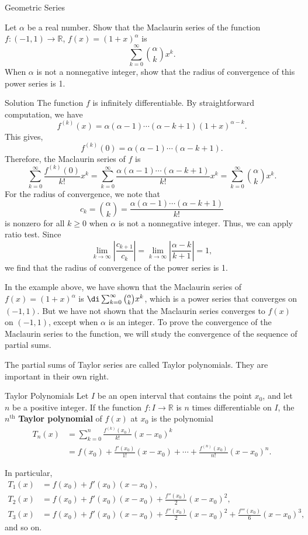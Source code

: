 \begin{example}[label=230305_16]{Geometric Series}
\begin{example}[label=230304_9]{}
\begin{example}{}
\begin{example}[label=230307_9]{}
Let $\alpha$ be a real number. Show that the Maclaurin series of the function $f:(-1,1)\to\mathbb{R}$, $f(x)=(1+x)^{\alpha}$ is
\[\sum_{k=0}^{\infty}\binom{\alpha}{k}x^k.\]
When $\alpha$ is not a nonnegative integer, show that the radius of convergence of this power series is 1.
\end{example}\begin{solution}{Solution}
The function $f$ is infinitely differentiable. By straightforward computation, we have
\[f^{(k)}(x)=\alpha(\alpha-1)\cdots (\alpha-k+1)(1+x)^{\alpha-k}.\]
This gives, 
\[f^{(k)}(0)=\alpha(\alpha-1)\cdots (\alpha-k+1).\]
Therefore, the Maclaurin series of $f$ is
\[\sum_{k=0}^{\infty}\frac{f^{(k)}(0)}{k!}x^k=\sum_{k=0}^{\infty}\frac{\alpha(\alpha-1)\cdots (\alpha-k+1)}{k!}x^k=\sum_{k=0}^{\infty}\binom{\alpha}{k}x^k.\]
For the radius of convergence, we note that
\[c_k=\binom{\alpha}{k}=\frac{\alpha(\alpha-1)\cdots(\alpha-k+1)}{k!}\] is nonzero for all $k\geq 0$ when $\alpha$ is not a nonnegative integer. Thus, we can apply ratio test. Since
\[\lim_{k\to\infty}\left|\frac{c_{k+1}}{c_k}\right|=\lim_{k\to\infty}\left|\frac{\alpha -k}{k+1}\right|=1,\]
we find that the radius of convergence of the power series is 1.
\end{solution}
In the example above, we have shown that the Maclaurin  series of $f(x)=(1+x)^{\alpha}$ is $\di \sum_{k=0}^{\infty}\binom{\alpha}{k}x^k$, which is a power series that converges on $(-1,1)$. But we have not shown that the Maclaurin series converges to $f(x)$ on $(-1,1)$, except when $\alpha$ is an integer. To prove the convergence of the Maclaurin series to the function, we will study the convergence of the sequence of partial sums.

The  partial sums of Taylor series are called Taylor polynomials. They are important in their own right.

\begin{definition}{Taylor Polynomials}
Let $I$ be an open interval that contains the point $x_0$, and let $n$ be a positive integer.  If  the function $f:I\to\mathbb{R}$ is $n$ times differentiable on $I$,  the $n^{\text{th}}$  {\bf Taylor polynomial} of $f(x)$ at $x_0$ is the polynomial
\begin{align*}T_n(x)&=\sum_{k=0}^{n}\frac{f^{(k)}(x_0)}{k!}(x-x_0)^k\\&=f(x_0)+\frac{f'(x_0)}{1!}(x-x_0) +\cdots+\frac{f^{(n)}(x_0)}{n!}(x-x_0)^n.\end{align*}
\end{definition}
In particular,
\begin{align*}
T_1(x)&=f(x_0)+f'(x_0)(x-x_0),\\
T_2(x)&=f(x_0)+f'(x_0)(x-x_0)+\frac{f''(x_0)}{2}(x-x_0)^2,\\
T_3(x)&=f(x_0)+f'(x_0)(x-x_0)+\frac{f''(x_0)}{2}(x-x_0)^2+\frac{f'''(x_0)}{6}(x-x_0)^3, 
\end{align*}and so on.  


\end{example}
\end{example}
\end{example}
